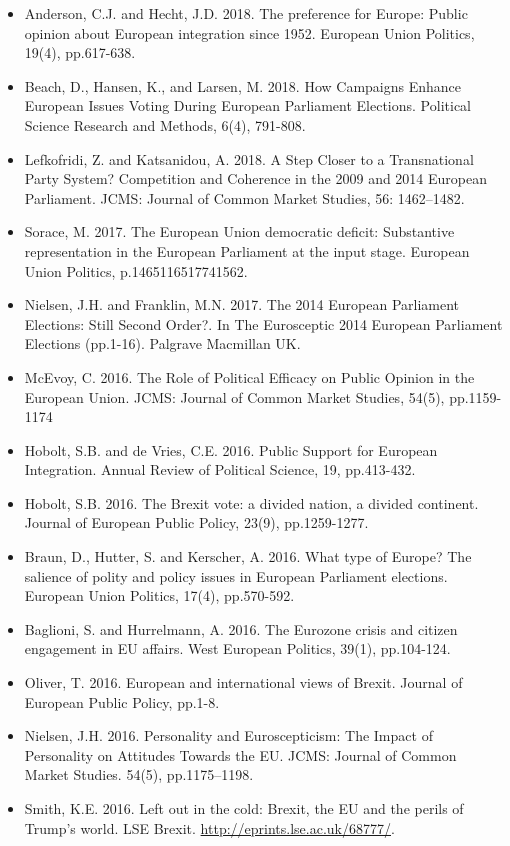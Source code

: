 \begin{itemize}
	\item Anderson, C.J. and Hecht, J.D. 2018. The preference for Europe: Public opinion about European integration since 1952. European Union Politics, 19(4), pp.617-638.
	\item Beach, D., Hansen, K., and Larsen, M. 2018. How Campaigns Enhance European Issues Voting During European Parliament Elections. Political Science Research and Methods, 6(4), 791-808. 
	\item Lefkofridi, Z. and Katsanidou, A. 2018. A Step Closer to a Transnational Party System? Competition and Coherence in the 2009 and 2014 European Parliament. JCMS: Journal of Common Market Studies, 56: 1462–1482.
	\item Sorace, M. 2017. The European Union democratic deficit: Substantive representation in the European Parliament at the input stage. European Union Politics, p.1465116517741562.
	\item Nielsen, J.H. and Franklin, M.N. 2017. The 2014 European Parliament Elections: Still Second Order?. In The Eurosceptic 2014 European Parliament Elections (pp.1-16). Palgrave Macmillan UK.
	\item McEvoy, C. 2016. The Role of Political Efficacy on Public Opinion in the European Union. JCMS: Journal of Common Market Studies, 54(5), pp.1159-1174
	\item Hobolt, S.B. and de Vries, C.E. 2016. Public Support for European Integration. Annual Review of Political Science, 19, pp.413-432.
	\item Hobolt, S.B. 2016. The Brexit vote: a divided nation, a divided continent. Journal of European Public Policy, 23(9), pp.1259-1277.
	\item Braun, D., Hutter, S. and Kerscher, A. 2016. What type of Europe? The salience of polity and policy issues in European Parliament elections. European Union Politics, 17(4), pp.570-592.
	\item Baglioni, S. and Hurrelmann, A. 2016. The Eurozone crisis and citizen engagement in EU affairs. West European Politics, 39(1), pp.104-124.
	\item Oliver, T. 2016. European and international views of Brexit. Journal of European Public Policy, pp.1-8.
	\item Nielsen, J.H. 2016. Personality and Euroscepticism: The Impact of Personality on Attitudes Towards the EU. JCMS: Journal of Common Market Studies. 54(5), pp.1175–1198.
	\item Smith, K.E. 2016. Left out in the cold: Brexit, the EU and the perils of Trump’s world. LSE Brexit. \url{http://eprints.lse.ac.uk/68777/}.

\end{itemize}

